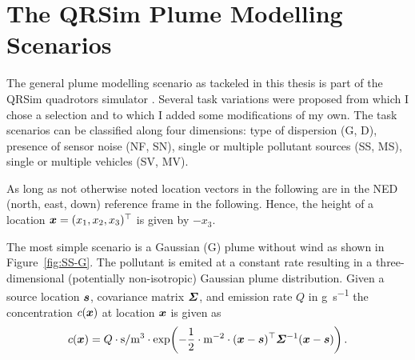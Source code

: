 \chapter{The QRSim Plume Modelling Scenarios}
The general plume modelling scenario as tackeled in this thesis is part of the 
QRSim quadrotors simulator \parencite{denardi2013rn}. Several task variations 
were proposed from which I chose a selection and to which I added some 
modifications of my own.  The task scenarios can be classified along four 
dimensions: type of dispersion (G, D), presence of sensor noise (NF, SN), single 
or multiple pollutant sources (SS, MS), single or multiple vehicles (SV, MV).

As long as not otherwise noted location vectors in the following are in the NED 
(north, east, down) reference frame in the following.  Hence, the height of 
a location $\bm{x} = (x_1, x_2, x_3)^{\top}$ is given by $-x_3$.

The most simple scenario is a Gaussian (G) plume without wind as shown in 
Figure~\ref{fig:SS-G}.  The pollutant is emited at a constant rate resulting in 
a three-dimensional (potentially non-isotropic) Gaussian plume distribution.  
Given a source location $\bm{s}$, covariance matrix $\bm{\varSigma}$, and 
emission rate $Q$ in \si{\gram\per\second} the concentration $c(\bm{x})$ at 
location $\bm{x}$ is given as
\begin{equation}
    c(\vc x) = Q \cdot \si{\second\per\meter^3} \cdot \exp\!\del{-\frac{1}{2} 
        \cdot \si{\meter^{-2}} \cdot (\vc x - \vc s)\Tr \mat \varSigma^{-1} (\vc 
        x - \vc s)}.
\end{equation}

